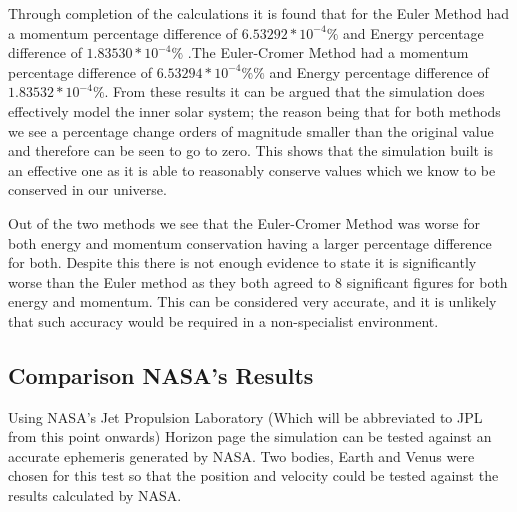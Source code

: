 \documentclass[a4paper,10pt]{article}
\begin{document}
Through completion of the calculations it is found that for the Euler Method had a momentum percentage difference of $6.53292*10^{-4}\%$ and Energy percentage difference of $1.83530*10^{-4}\%$ .The Euler-Cromer Method had a momentum percentage difference of $6.53294*10^{-4}\%\%$ and Energy percentage difference of $1.83532*10^{-4}\%$. From these results it can be argued that the simulation does effectively model the inner solar system; the reason being that for both methods we see a percentage change orders of magnitude smaller than the original value and therefore can be seen to go to zero. This shows that the simulation built is an effective one as it is able to reasonably conserve values which we know to be conserved in our universe. 

Out of the two methods we see that the Euler-Cromer Method was worse for both energy and momentum conservation having a larger percentage difference for both. Despite this there is not enough evidence to state it is significantly worse than the Euler method as they both agreed to 8 significant figures for both energy and momentum. This can be considered very accurate, and it is unlikely that such accuracy would be required in a non-specialist environment.

\subsection{Comparison NASA's Results}
Using NASA's Jet Propulsion Laboratory (Which will be abbreviated to JPL from this point onwards) Horizon page \cite{} the simulation can be tested against an accurate ephemeris generated by NASA. Two bodies, Earth and Venus were chosen for this test so that the position and velocity could be tested against the results calculated by NASA.
\end{document}
